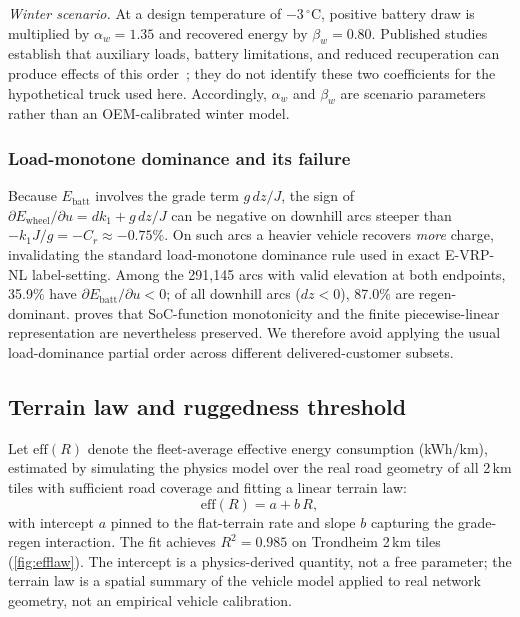 \documentclass[review,3p,authoryear]{elsarticle}
\newcommand{\eff}{\mathrm{eff}}
\begin{document}
\emph{Winter scenario.}  At a design temperature of $-3\,^{\circ}$C,
positive battery draw is multiplied by $\alpha_w = 1.35$ and recovered
energy by $\beta_w = 0.80$.  Published studies establish that auxiliary
loads, battery limitations, and reduced recuperation can produce effects of
this order~\citep{Steinstraeter2021,Neubauer2014,Jeffers2016}; they do not
identify these two coefficients for the hypothetical truck used here.
Accordingly, $\alpha_w$ and $\beta_w$ are scenario parameters rather than
an OEM-calibrated winter model.

\subsubsection*{Load-monotone dominance and its failure}
\label{sec:dominance}

Because $E_{\text{batt}}$ involves the grade term $g\,dz/J$, the sign of
$\partial E_{\text{wheel}} / \partial u = d k_1 + g\,dz/J$ can be
negative on downhill arcs steeper than $-k_1 J / g = -C_r \approx
-0.75\%$.  On such arcs a heavier vehicle recovers \emph{more}
charge, invalidating the standard load-monotone dominance rule used in
exact E-VRP-NL label-setting.  Among the 291{,}145 arcs with valid
elevation at both endpoints, 35.9\%
have $\partial E_{\text{batt}} / \partial u < 0$; of all downhill arcs
($dz < 0$), 87.0\% are regen-dominant.   proves that
SoC-function monotonicity and the finite piecewise-linear representation
are nevertheless preserved.  We therefore avoid applying the usual
load-dominance partial order across different delivered-customer subsets.

\subsection{Terrain law and ruggedness threshold}
\label{sec:threshold}

Let $\eff(R)$ denote the fleet-average effective energy consumption
(kWh/km), estimated by simulating the physics model over the real road
geometry of all 2\,km tiles with sufficient road coverage and fitting a
linear terrain law:
\begin{equation}
  \eff(R) = a + b\,R,
  \label{eq:terrainlaw}
\end{equation}
with intercept $a$ pinned to the flat-terrain rate and slope $b$ capturing
the grade-regen interaction.  The fit achieves $R^2 = 0.985$ on
Trondheim 2\,km tiles (\cref{fig:efflaw}).  The intercept is a
physics-derived quantity, not a free parameter; the terrain law is a
spatial summary of the vehicle model applied to real network geometry,
not an empirical vehicle calibration.
\end{document}
